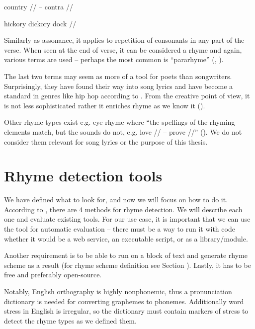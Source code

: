country // -- contra //

hickory dickory dock //

\noindent Similarly as assonance, it applies to repetition of consonants in any part of the verse. When seen at the end of verse, it can be considered a rhyme and again, various terms are used -- perhaps the most common is ``pararhyme'' (\cite{britannica}, \cite{oxforddict2008literary}).
\newline

The last two terms may seem as more of a tool for poets than songwriters. Surprisingly, they have found their way into song lyrics and have become a standard in genres like hip hop according to \cite{vanphonological}. From the creative point of view, it is not less sophisticated rather it enriches rhyme as we know it (\cite{brogan2016poeticterms}).


Other rhyme types exist e.g. eye rhyme where ``the spellings of the rhyming elements match, but the sounds do not, e.g. love // -- prove //'' (\cite{oxforddict2008literary}). We do not consider them relevant for song lyrics or the purpose of this thesis.


\section{Rhyme detection tools}\label{rhyme_detection_tools}
We have defined what to look for, and now we will focus on how to do it. According to \cite{plechac2017presentation}, there are 4 methods for rhyme detection. We will describe each one and evaluate existing tools. For our use case, it is important that we can use the tool for automatic evaluation -- there must be a way to run it with code whether it would be a web service,  an executable script, or as a library/module.

Another requirement is to be able to run on a block of text and generate rhyme scheme as a result (for rhyme scheme definition see Section \label{sec:scheme}). Lastly, it has to be free and preferably open-source.

Notably, English orthography is highly nonphonemic, thus a pronunciation dictionary is needed for converting graphemes to phonemes. Additionally word stress in English is irregular, so the dictionary must contain markers of stress to detect the rhyme types as we defined them.

